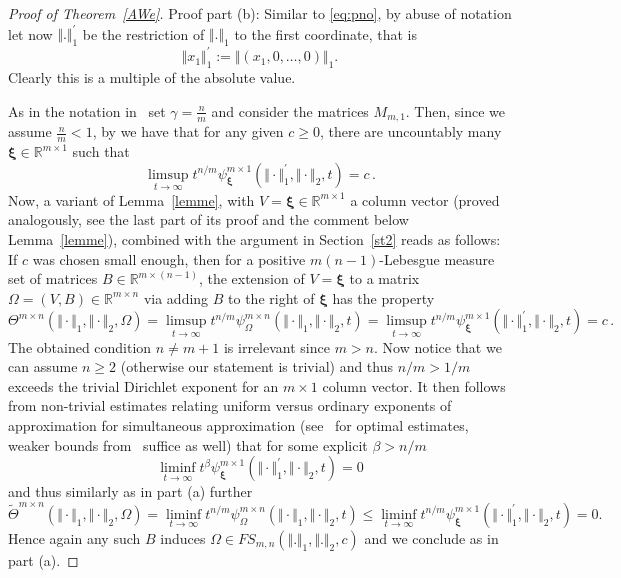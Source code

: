 \documentclass[10pt]{amsart}
\theoremstyle{definition}
\newcommand{\ux}{\boldsymbol{\xi}}
\begin{document}
\begin{proof}[Proof of Theorem~\ref{AWe}]
 Proof part (b): Similar to \eqref{eq:pno}, by abuse of notation
 let now $\Vert.\Vert_1^{\prime}$ be the restriction of $\Vert.\Vert_1$ to the first coordinate, that is
 \[
 \Vert x_1 \Vert_1^{\prime}:= \Vert (x_1,0,\ldots,0)\Vert_1.
 \]
 Clearly this is a multiple of the absolute value.

 As in the notation in~\cite[Corollary~1]{AginWeiss2024} set $\gamma=\tfrac{n}{m}$ and consider the matrices $M_{m,1}$. Then, since we assume $\tfrac{n}{m}<1$, by \cite[Corollary~1]{AginWeiss2024} we have that for any given $c\ge 0$, there are uncountably many $\ux\in \mathbb{R}^{m\times 1}$ such that
 \[
   \limsup_{t\to\infty} t^{n/m}\psi_{\ux}^{m\times 1}(\Vert \cdot \Vert_{1}^{\prime},\Vert \cdot \Vert_{2},t)=c\, .
     \]
     Now, a variant of Lemma~\ref{lemme}, with $V=\ux\in \mathbb{R}^{m\times 1}$ a column vector (proved analogously, see the
     last part of its proof and the comment below Lemma~\ref{lemme}), combined with the argument in Section~\ref{st2} reads as follows: If $c$ was chosen small enough, then 
     for a positive $m(n-1)$-Lebesgue measure set of matrices $B\in \mathbb{R}^{m\times (n-1)}$,
     the extension of $V=\ux$ to a matrix $\Omega=(V,B)\in \mathbb{R}^{m\times n}$
     via adding $B$ to the right of $\ux$ has the property
        \[
        \Theta^{m\times n}(\Vert\cdot\Vert_1,\Vert\cdot\Vert_2,\Omega)=\limsup_{t\to\infty} t^{n/m}\psi_{\Omega}^{m\times n}(\Vert \cdot \Vert_{1},\Vert \cdot \Vert_{2},t)=
     \limsup_{t\to\infty} t^{n/m}\psi_{\ux}^{m\times 1}(\Vert \cdot \Vert_{1}^{\prime},\Vert \cdot \Vert_{2},t)=c\, .
     \]
     The obtained condition $n\ne m+1$
     is irrelevant since $m>n$. Now notice that we can assume $n
     \ge 2$ (otherwise our statement is trivial) and thus $n/m>1/m$ exceeds the trivial Dirichlet exponent for
     an $m\times 1$ column vector. It then follows from non-trivial estimates relating uniform versus ordinary exponents of approximation for simultaneous approximation (see~\cite{mamo} for optimal estimates, weaker bounds from~\cite{SchmidtSummerer} suffice as well) that
     for some explicit $\beta>n/m$
     \[
     \liminf_{t\to\infty} t^{\beta}\psi_{\ux}^{m\times 1}(\Vert \cdot \Vert_{1}^{\prime},\Vert \cdot \Vert_{2},t)=0
     \]
     and thus similarly as in part (a) further
       \[
        \tilde{\Theta}^{m\times n}(\Vert\cdot\Vert_1,\Vert\cdot\Vert_2,\Omega)=\liminf_{t\to\infty} t^{n/m}\psi_{\Omega}^{m\times n}(\Vert \cdot \Vert_{1},\Vert \cdot \Vert_{2},t)\le 
     \liminf_{t\to\infty} t^{n/m}\psi_{\ux}^{m\times 1}(\Vert \cdot \Vert_{1}^{\prime},\Vert \cdot \Vert_{2},t)=0.
     \]
     Hence again any such $B$ induces $\Omega\in FS_{m,n}(\Vert.\Vert_1, \Vert.\Vert_2,c)$ and we conclude as in part (a). 
 \end{proof} 
 
\end{document}
